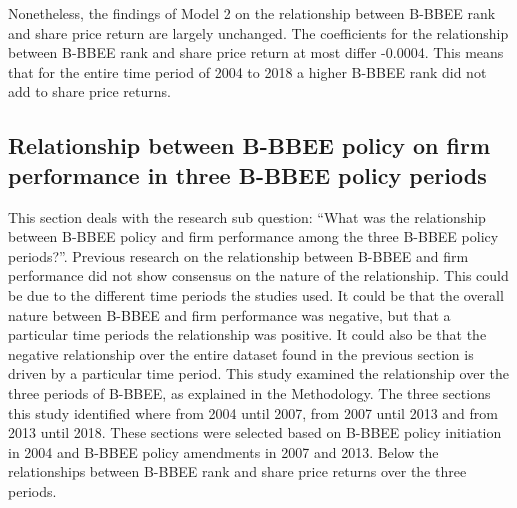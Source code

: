 Nonetheless, the findings of Model 2 on the relationship between B-BBEE rank and share price return are largely unchanged. The coefficients for the relationship between B-BBEE rank and share price return at most differ -0.0004. This means that for the entire time period of 2004 to 2018 a higher B-BBEE rank did not add to share price returns.
\subsection{Relationship between B-BBEE policy on firm performance in three B-BBEE policy periods}
This section deals with the research sub question: “What was the relationship between B-BBEE policy and firm performance among the three B-BBEE policy periods?”. Previous research on the relationship between B-BBEE and firm performance did not show consensus on the nature of the relationship. This could be due to the different time periods the studies used. It could be that the overall nature between B-BBEE and firm performance was negative, but that a particular time periods the relationship was positive. It could also be that the negative relationship over the entire dataset found in the previous section is driven by a particular time period. This study examined the relationship over the three periods of B-BBEE, as explained in the Methodology. The three sections this study identified where from 2004 until 2007, from 2007 until 2013 and from 2013 until 2018. These sections were selected based on B-BBEE policy initiation in 2004 and B-BBEE policy amendments in 2007 and 2013. Below the relationships between B-BBEE rank and share price returns over the three periods.

